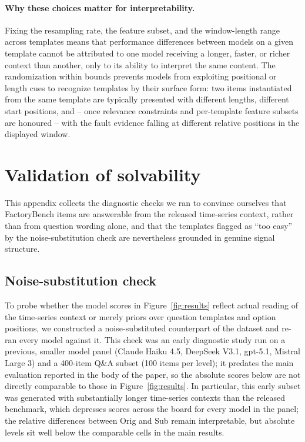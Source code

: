 \paragraph{Why these choices matter for interpretability.} Fixing the resampling rate, the feature subset, and the window-length range across templates means that performance differences between models on a given template cannot be attributed to one model receiving a longer, faster, or richer context than another, only to its ability to interpret the same content. The randomization within bounds prevents models from exploiting positional or length cues to recognize templates by their surface form: two items instantiated from the same template are typically presented with different lengths, different start positions, and -- once relevance constraints and per-template feature subsets are honoured -- with the fault evidence falling at different relative positions in the displayed window.

\section{Validation of solvability}
\label{app:solvability}

This appendix collects the diagnostic checks we ran to convince ourselves that FactoryBench items are answerable from the released time-series context, rather than from question wording alone, and that the templates flagged as ``too easy'' by the noise-substitution check are nevertheless grounded in genuine signal structure.

\subsection{Noise-substitution check}
\label{app:noise_substitution}

To probe whether the model scores in Figure~\ref{fig:results} reflect actual reading of the time-series context or merely priors over question templates and option positions, we constructed a noise-substituted counterpart of the dataset and re-ran every model against it. This check was an early diagnostic study run on a previous, smaller model panel (Claude Haiku 4.5, DeepSeek V3.1, gpt-5.1, Mistral Large 3) and a 400-item Q\&A subset (100 items per level); it predates the main evaluation reported in the body of the paper, so the absolute scores below are not directly comparable to those in Figure~\ref{fig:results}. In particular, this early subset was generated with substantially longer time-series contexts than the released benchmark, which depresses scores across the board for every model in the panel; the relative differences between Orig and Sub remain interpretable, but absolute levels sit well below the comparable cells in the main results.

